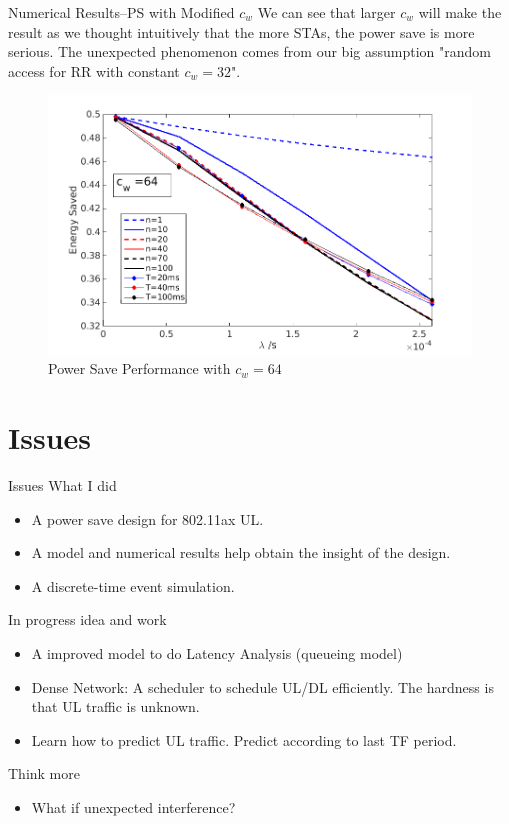 \documentclass[10pt]{beamer}
\begin{document}
\begin{frame}{Numerical Results--PS with Modified $c_w$}
We can see that larger $c_w$ will make the result as we thought intuitively that the more STAs, the power save is more serious.
The unexpected phenomenon comes from our big assumption "random access for RR with constant $c_w=32$".
\begin{figure}
\includegraphics[scale=0.36]{./figure/test_per_3.png}
\caption{Power Save Performance with $c_w=64$}
\label{fig_PS_2}
\end{figure}
\end{frame}
\section{Issues}
\begin{frame}{Issues}
	What I did
	\begin{itemize}
		\item
		A power save design for 802.11ax UL. 
		\item 
		A model and numerical results help obtain the insight of the design.
		\item 
		A discrete-time event simulation.
	\end{itemize}
    In progress idea and work
    \begin{itemize}
        \item
        A improved model to do \alert{Latency Analysis} (queueing model)
        \item \alert{Dense Network}: 
        A scheduler to schedule UL/DL efficiently. The hardness is that UL traffic is unknown.
        \item 
        Learn how to predict UL traffic. Predict according to last TF period.
    \end{itemize}
    Think more\\
    \begin{itemize}
    \item
    What if unexpected interference?    
    \end{itemize}
\end{frame}
\end{document}

